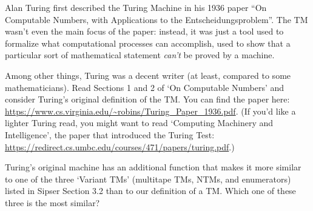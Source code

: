 \documentclass[letterpaper,11pt,twoside]{article}
\theoremstyle{plain}
\theoremstyle{definition}
\theoremstyle{remark}
\theoremstyle{restate}
\begin{document}
Alan Turing first described the Turing Machine  in his 1936 paper ``On Computable Numbers, with Applications to the Entscheidungsproblem''. The TM wasn't even the main focus of the paper: instead, it was just a tool used to formalize what computational processes can accomplish, used to show that a particular sort of mathematical statement \emph{can't} be proved by a machine.

Among other things, Turing was a decent writer (at least, compared to some mathematicians). Read Sections 1 and 2 of `On Computable Numbers' and consider Turing's original definition of the TM. You can find the paper here: \url{https://www.cs.virginia.edu/~robins/Turing_Paper_1936.pdf}. (If you'd like a lighter Turing read, you might want to read `Computing Machinery and Intelligence', the paper that introduced the Turing Test: \url{https://redirect.cs.umbc.edu/courses/471/papers/turing.pdf}.)

Turing's original machine has an additional function that makes it more similar to one of the three `Variant TMs' (multitape TMs, NTMs, and enumerators) listed in Sipser Section 3.2 than to our definition of a TM. Which one of these three is the most similar?
\end{document}
